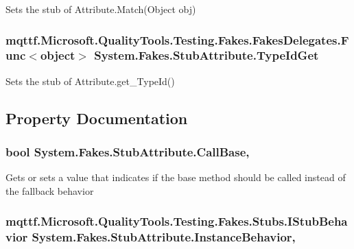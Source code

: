 Sets the stub of Attribute.\-Match(\-Object obj)

\hypertarget{class_system_1_1_fakes_1_1_stub_attribute_a3c4562bed251642c4f1fe745866e0397}{
\subsubsection[{Type\-Id\-Get}]{\setlength{\rightskip}{0pt plus 5cm}mqttf.\-Microsoft.\-Quality\-Tools.\-Testing.\-Fakes.\-Fakes\-Delegates.\-Func$<$object$>$ System.\-Fakes.\-Stub\-Attribute.\-Type\-Id\-Get}}\label{class_system_1_1_fakes_1_1_stub_attribute_a3c4562bed251642c4f1fe745866e0397}


Sets the stub of Attribute.\-get\-\_\-\-Type\-Id()



\subsection{Property Documentation}
\hypertarget{class_system_1_1_fakes_1_1_stub_attribute_a31c703e4dd5a586a9bc48fce00b3bd63}{
\subsubsection[{Call\-Base}]{\setlength{\rightskip}{0pt plus 5cm}bool System.\-Fakes.\-Stub\-Attribute.\-Call\-Base\hspace{0.3cm}{\ttfamily [get]}, {\ttfamily [set]}}}\label{class_system_1_1_fakes_1_1_stub_attribute_a31c703e4dd5a586a9bc48fce00b3bd63}


Gets or sets a value that indicates if the base method should be called instead of the fallback behavior

\hypertarget{class_system_1_1_fakes_1_1_stub_attribute_ab325e6620a06934bee8ab027d1e8278a}{
\subsubsection[{Instance\-Behavior}]{\setlength{\rightskip}{0pt plus 5cm}mqttf.\-Microsoft.\-Quality\-Tools.\-Testing.\-Fakes.\-Stubs.\-I\-Stub\-Behavior System.\-Fakes.\-Stub\-Attribute.\-Instance\-Behavior\hspace{0.3cm}{\ttfamily [get]}, {\ttfamily [set]}}}\label{class_system_1_1_fakes_1_1_stub_attribute_ab325e6620a06934bee8ab027d1e8278a}


